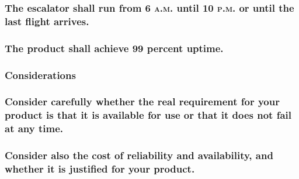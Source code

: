 \documentclass[
]{article}
\begin{document}
\hypertarget{the-escalator-shall-run-from-6-a.m.-until-10-p.m.-or-until-the-last-flight-arrives.}{%
\subsubsection{\texorpdfstring{The escalator shall run from 6
\textsc{a.m.} until 10 \textsc{p.m}. or until the last flight
arrives.}{The escalator shall run from 6 a.m. until 10 p.m. or until the last flight arrives.}}\label{the-escalator-shall-run-from-6-a.m.-until-10-p.m.-or-until-the-last-flight-arrives.}}

\hypertarget{the-product-shall-achieve-99-percent-uptime.}{%
\subsubsection{The product shall achieve 99 percent
uptime.}\label{the-product-shall-achieve-99-percent-uptime.}}

\hypertarget{considerations-28}{%
\subsubsection{Considerations}\label{considerations-28}}

\hypertarget{consider-carefully-whether-the-real-requirement-for-your-product-is-that-it-is-available-for-use-or-that-it-does-not-fail-at-any-time.}{%
\subsubsection{\texorpdfstring{Consider carefully whether the real
requirement for your product is that it is available for use or that it
does not fail at any time.
}{Consider carefully whether the real requirement for your product is that it is available for use or that it does not fail at any time. }}\label{consider-carefully-whether-the-real-requirement-for-your-product-is-that-it-is-available-for-use-or-that-it-does-not-fail-at-any-time.}}

\hypertarget{consider-also-the-cost-of-reliability-and-availability-and-whether-it-is-justified-for-your-product.}{%
\subsubsection{Consider also the cost of reliability and availability,
and whether it is justified for your
product.}\label{consider-also-the-cost-of-reliability-and-availability-and-whether-it-is-justified-for-your-product.}}
\end{document}
